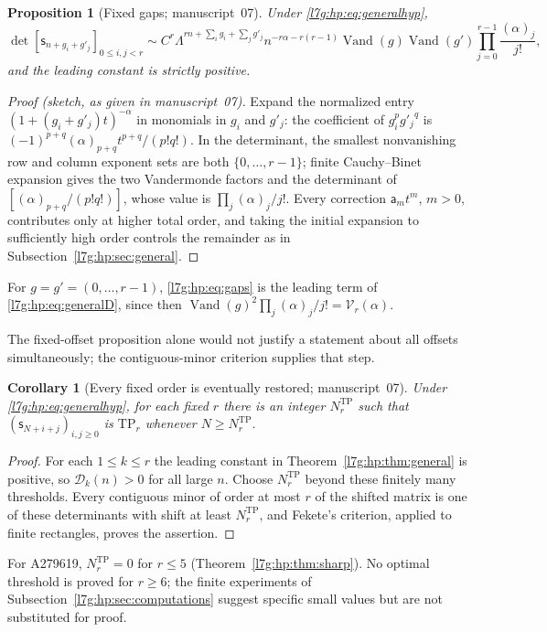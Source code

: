 \documentclass[11pt,letterpaper]{article}
\newtheorem{proposition}[theorem]{Proposition}
\newtheorem{corollary}[theorem]{Corollary}
\theoremstyle{remark}\newtheorem{remark}[theorem]{Remark}
\newcommand{\TP}{\mathrm{TP}}\newcommand{\TN}{\mathrm{TN}}
\newcounter{l7gtrsavedeq}
\begin{document}
\begin{proposition}[Fixed gaps; manuscript~07]\label{l7g:hp:prop:gaps}
Under \eqref{l7g:hp:eq:generalhyp},
\begin{equation}\label{l7g:hp:eq:gaps}
 \det[\mathsf s_{n+g_i+g'_j}]_{0\le i,j<r}\sim
 C^r\Lambda^{rn+\sum_ig_i+\sum_jg'_j}n^{-r\alpha-r(r-1)}
 \operatorname{Vand}(g)\operatorname{Vand}(g')\prod_{j=0}^{r-1}\frac{(\alpha)_j}{j!},
\end{equation}
and the leading constant is strictly positive.
\end{proposition}
\begin{proof}[Proof (sketch, as given in manuscript~07)]
Expand the normalized entry $(1+(g_i+g'_j)t)^{-\alpha}$ in monomials in
$g_i$ and $g'_j$: the coefficient of $g_i^p{g'_j}^q$ is
$(-1)^{p+q}(\alpha)_{p+q}t^{p+q}/(p!q!)$. In the determinant, the smallest
nonvanishing row and column exponent sets are both $\{0,\dots,r-1\}$;
finite Cauchy--Binet expansion gives the two Vandermonde factors and the
determinant of $[(\alpha)_{p+q}/(p!q!)]$, whose value is
$\prod_j(\alpha)_j/j!$. Every correction $\mathsf a_mt^m$, $m>0$,
contributes only at higher total order, and taking the initial expansion to
sufficiently high order controls the remainder as in
Subsection~\ref{l7g:hp:sec:general}.
\end{proof}
For $g=g'=(0,\dots,r-1)$, \eqref{l7g:hp:eq:gaps} is the leading term of
\eqref{l7g:hp:eq:generalD}, since then
$\operatorname{Vand}(g)^2\prod_j(\alpha)_j/j!=\mathcal V_r(\alpha)$.

The fixed-offset proposition alone would not justify a statement about all
offsets simultaneously; the contiguous-minor criterion supplies that step.

\begin{corollary}[Every fixed order is eventually restored; manuscript~07]\label{l7g:hp:cor:eventual}
Under \eqref{l7g:hp:eq:generalhyp}, for each fixed $r$ there is an integer
$N^{\TP}_r$ such that $(\mathsf s_{N+i+j})_{i,j\ge0}$ is $\TP_r$ whenever
$N\ge N^{\TP}_r$.
\end{corollary}
\begin{proof}
For each $1\le k\le r$ the leading constant in
Theorem~\ref{l7g:hp:thm:general} is positive, so $\mathcal D_k(n)>0$ for
all large $n$. Choose $N^{\TP}_r$ beyond these finitely many thresholds.
Every contiguous minor of order at most $r$ of the shifted matrix is one of
these determinants with shift at least $N^{\TP}_r$, and Fekete's criterion,
applied to finite rectangles, proves the assertion.
\end{proof}
For A279619, $N^{\TP}_r=0$ for $r\le5$ (Theorem~\ref{l7g:hp:thm:sharp}).
No optimal threshold is proved for $r\ge6$; the finite experiments of
Subsection~\ref{l7g:hp:sec:computations} suggest specific small values but
are not substituted for proof.
\end{document}
